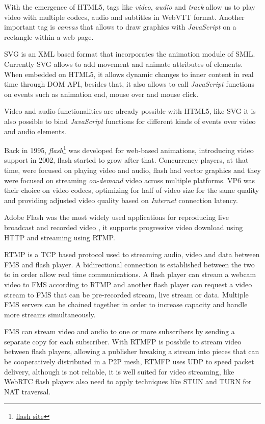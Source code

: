   With the emergence of \ac{HTML}5, tags like \textit{video}, \textit{audio} and \textit{track} allow us to play video with multiple codecs, audio and subtitles in \ac{WebVTT} format. Another important tag is \textit{canvas} that allows to draw graphics with \textit{JavaScript} on a rectangle within a web page.

  \ac{SVG} is an \ac{XML} based format that incorporates the animation module of \ac{SMIL}. Currently \ac{SVG} allows to add movement and animate attributes of elements. When embedded on \ac{HTML}5, it allows dynamic changes to inner content in real time through \ac{DOM} \ac{API}, besides that, it also allows to call \textit{JavaScript} functions on events such as animation end, mouse over and mouse click.

  Video and audio functionalities are already possible with \ac{HTML}5, like \ac{SVG} it is also possible to bind \textit{JavaScript} functions for different kinds of events over video and audio elements.

  Back in 1995, \textit{flash}\footnote{\url{flash site}} was developed for web-based animations, introducing video support in 2002, flash started to grow after that. Concurrency players, at that time, were focused on playing video and audio, flash had vector graphics and they were focused on streaming \textit{on-demand} video across multiple platforms. VP6 was their choice on video codecs, optimizing for half of video size for the same quality and providing adjusted video quality based on \textit{Internet} connection latency. 

  Adobe Flash was the most widely used applications for reproducing live broadcast and recorded video \cite{flashvideo}, it supports progressive video download using \ac{HTTP} and streaming using \ac{RTMP}. 

  \ac{RTMP} is a \ac{TCP} based protocol used to streaming audio, video and data between \ac{FMS} and flash player. A bidirectional connection is established between the two to in order allow real time communications. A flash player can stream a webcam video to \ac{FMS} according to \ac{RTMP} and another flash player can request a video stream to \ac{FMS} that can be pre-recorded stream, live stream or data. Multiple \ac{FMS} servers can be chained together in order to increase capacity and handle more streams simultaneously.

  \ac{FMS} can stream video and audio to one or more subscribers by sending a separate copy for each subscriber. With \ac{RTMFP} is possbile to stream video between flash players, allowing a publisher breaking a stream into pieces that can be cooperatively distributed in a P2P mesh, \ac{RTMFP} uses \ac{UDP} to speed packet delivery, although is not reliable, it is well suited for video streaming, like \ac{WebRTC} flash players also need to apply techniques like \ac{STUN} and \ac{TURN} for \ac{NAT} traversal.

